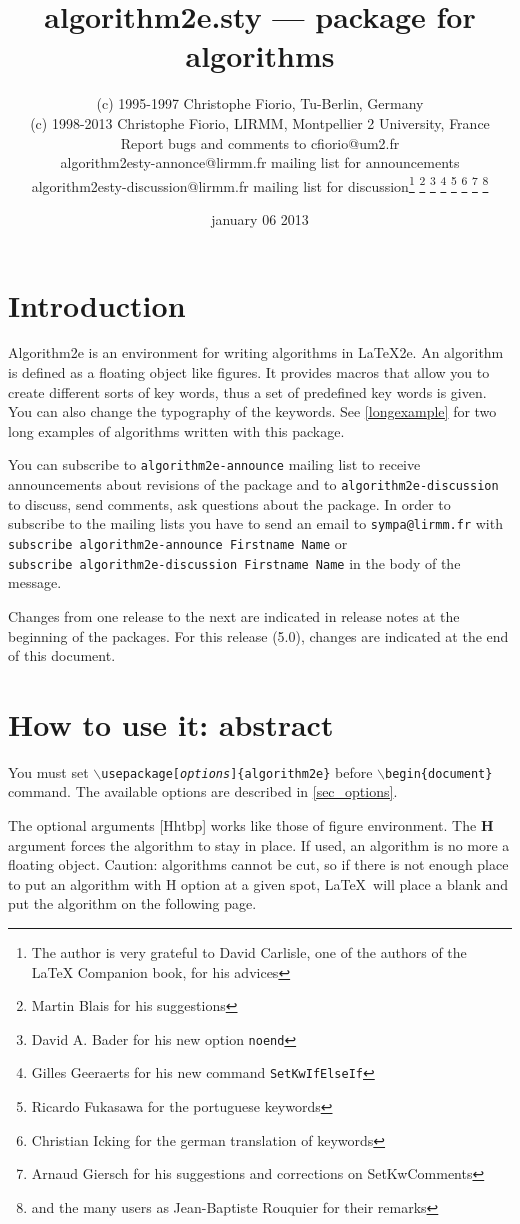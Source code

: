 \documentclass[a4paper]{article}
\title{algorithm2e.sty --- package for algorithms\\ {\large\algocfversion}}
\author{(c) 1995-1997 Christophe Fiorio, Tu-Berlin, Germany\\
(c) 1998-2013 Christophe Fiorio, LIRMM, Montpellier 2 University, France\\
  Report bugs and comments to cfiorio@um2.fr\\
  algorithm2esty-annonce@lirmm.fr mailing list for announcements\\
  algorithm2esty-discussion@lirmm.fr mailing list for discussion\thanks{The author is very grateful
    to David Carlisle, one of the authors of the LaTeX Companion book, for his advices} \thanks{Martin Blais for his
    suggestions} \thanks{David A. Bader for his new option
    \texttt{noend}} \thanks{Gilles Geeraerts for his new
    command \texttt{SetKwIfElseIf}} \thanks{Ricardo Fukasawa for the portuguese keywords} \thanks{Christian Icking 
  for the german translation of keywords} 
  \thanks{Arnaud Giersch for his suggestions and corrections on SetKwComments}
\thanks{and the many users as Jean-Baptiste Rouquier
  for their remarks} } \date{january 06 2013}
\begin{document}
\maketitle
\vspace{-0.5cm}

\tableofcontents
\clearpage

\section{Introduction}

Algorithm2e is an environment for writing algorithms in \LaTeX2e{}.  An algorithm is defined as a floating object
like figures.  It provides macros that allow you to create different sorts of key words, thus a set of predefined
key words is given. You can also change the typography of the keywords. See \autoref{longexample} for two long
examples of algorithms written with this package.


You can subscribe to \texttt{algorithm2e-announce} mailing list to receive
announcements about revisions of the package and to
\texttt{algorithm2e-discussion} to discuss, send comments,
ask questions about the package.
\makeatletter
In order to subscribe to the mailing lists you have to send an email to
\texttt{sympa@lirmm.fr} with \texttt{subscribe algorithm2e-announce Firstname
  Name} or\\\texttt{subscribe algorithm2e-discussion Firstname
  Name} in the body of the message.\makeatother

Changes from one release to the next are indicated in release notes at the beginning of the packages. For this
release (5.0), changes are indicated at the end of this document.

\section{How to use it: abstract}

You must set
\texttt{$\backslash$usepackage[\emph{options}]\{algorithm2e\}} before
\texttt{$\backslash$begin\{document\}} command. The available options
are described in \autoref{sec_options}.


The optional arguments [Hhtbp] works like those of figure environment.  The
\textbf{H} argument forces the algorithm to stay in place. If used, an algorithm
is no more a floating object.  Caution: algorithms cannot be cut, so if there is
not enough place to put an algorithm with H option at a given spot, \LaTeX\ will
place a blank and put the algorithm on the following page.
\end{document}
